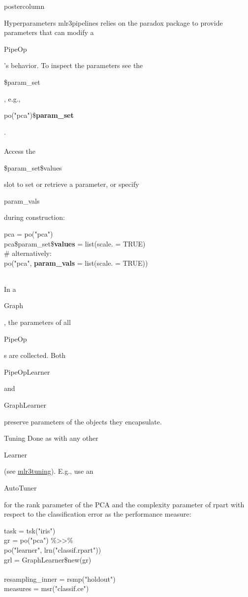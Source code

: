 \documentclass{beamer}
\newlength{\columnheight} %
\newcommand{\codeinline}[1]{\begin{codeboxinline}#1\end{codeboxinline}}
\begin{document}
\begin{frame}[fragile]{}
\begin{columns}
\begin{column}{.245\textwidth}
\begin{beamercolorbox}[center]{postercolumn}
				\begin{minipage}{.98\textwidth}
					\parbox[t][\columnheight]{\textwidth}{
            \begin{myblock}{Hyperparameters}
              mlr3pipelines relies on the paradox package to provide parameters that can modify a \codeinline{PipeOp}'s behavior. To inspect the parameters see the \codeinline{\$param\_set}, e.g., \codeinline{po("pca")\$\textbf{param\_set}}.\\
              \ \\
              Access the \codeinline{\$param\_set\$values} slot to set or retrieve a parameter, or specify \codeinline{param\_vals} during construction:
              \begin{codeboxmultiline}[width=25cm]
                pca = po("pca") \\
                pca\$param\_set\$\textbf{values} = list(scale. = TRUE) \\
                \# alternatively:\\
                po("pca", \textbf{param\_vals} = list(scale. = TRUE))
              \end{codeboxmultiline}
              \ \\
              In a \codeinline{Graph}, the parameters of all \codeinline{PipeOp}s are collected. Both \codeinline{PipeOpLearner} and \codeinline{GraphLearner} preserve parameters of the objects they encapsulate.
            \end{myblock}
            \begin{myblock}{Tuning}
              Done as with any other \codeinline{Learner} (see \href{FIXME:CheatsheetLink}{mlr3tuning}). E.g., use an \codeinline{AutoTuner} for the rank parameter of the PCA and the complexity parameter of rpart with respect to the classification error as the performance measure:
              \begin{codeboxexample}
						  {\footnotesize
                task = tsk("iris")\\
                gr = po("pca") \%>{}>\%\\
                \hspace*{1ex} po("learner", lrn("classif.rpart"))\\
                grl = GraphLearner\$new(gr)\\
                \ \\
                resampling\_inner = rsmp("holdout")\\
                measures = msr("classif.ce")\\
}
\end{codeboxexample}
\end{myblock}}
\end{minipage}
\end{beamercolorbox}
\end{column}
\end{columns}
\end{frame}
\end{document}
